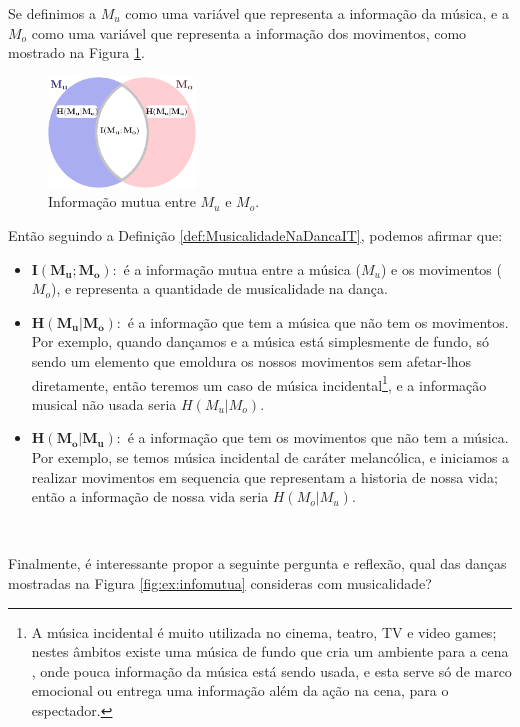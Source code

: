 Se definimos a $M_u$ como uma variável que representa a informação da música, e 
a $M_o$ como uma variável que representa a informação dos movimentos, 
como mostrado na Figura \ref{fig:InfoMutuaMuMo}.
\begin{figure}[!h]
  \centering
    \includegraphics[width=0.35\textwidth]{chapters/cap-musicalidade/musicalidade-it.eps}
\caption{Informação mutua entre $M_u$ e $M_o$.}
\label{fig:InfoMutuaMuMo}
\end{figure}

Então seguindo a Definição \ref{def:MusicalidadeNaDancaIT},
podemos afirmar que:
\begin{itemize}
\item $\mathbf{I(M_u;M_o):}$ é a informação mutua entre a música ($M_u$) e os movimentos ($M_o$),
e representa a quantidade de musicalidade na dança.
\item $\mathbf{H(M_u|M_o):}$ é a informação que tem a música que não tem os movimentos.
Por exemplo, quando dançamos e a música está simplesmente de fundo, 
só sendo um elemento que emoldura os nossos movimentos sem afetar-lhos diretamente,
então teremos um caso de música incidental\footnote{A música incidental é muito utilizada no cinema, 
teatro, TV e video games; nestes âmbitos existe uma música de fundo que cria um ambiente para a cena \cite[pp. 17]{reinato2010musica} \cite[pp. 217]{dourado2004dicionario},
onde pouca informação da música está sendo usada, e esta serve só de marco emocional ou entrega uma informação além da ação na cena, para o espectador.}, e a informação musical não usada seria $H(M_u|M_o)$.
\item $\mathbf{H(M_o|M_u):}$ é a informação que tem os movimentos que não tem a música.
Por exemplo, se temos música incidental de caráter melancólica, e iniciamos a 
realizar movimentos em sequencia que representam a historia de nossa vida;
então a informação de nossa vida seria  $H(M_o|M_u)$.
\end{itemize}~

Finalmente, é interessante propor a seguinte pergunta e reflexão,
qual das danças mostradas na Figura \ref{fig:ex:infomutua} consideras com musicalidade?


